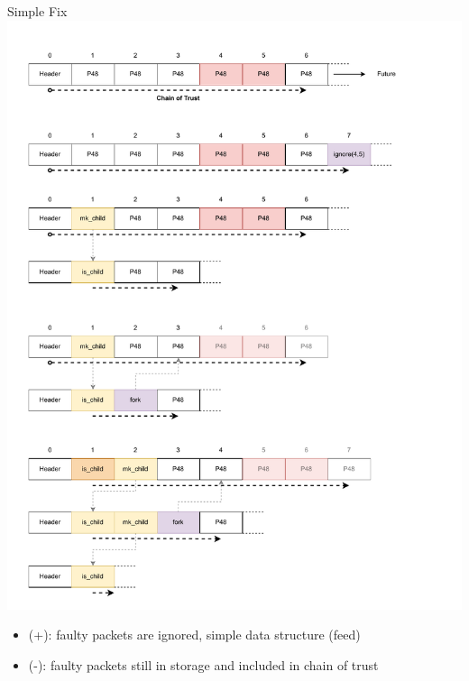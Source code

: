 \documentclass[aspectratio=169]{beamer}
\begin{document}
\begin{frame}[c]{Simple Fix}
        \includegraphics[width=1\textwidth]{images/fork_2.pdf}
        \begin{itemize}
        		\item (+): faulty packets are ignored, simple data structure (feed)
		\item (-): faulty packets still in storage and included in chain of trust
	\end{itemize}
\end{frame}

\end{document}
